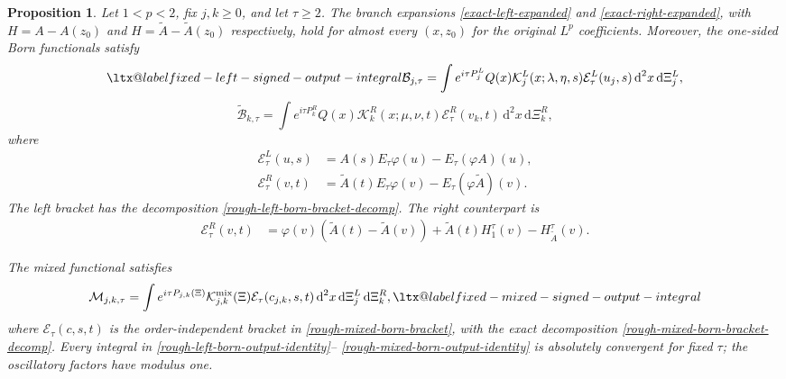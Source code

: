 \documentclass[a4paper,11pt]{article}
\makeatletter
\newcommand{\dd}{\,\text{d}}
\newcommand{\aliaslabel}[1]{\ltx@label{#1}}
\theoremstyle{plain}
\newtheorem{prop}[thm]{Proposition}
\theoremstyle{definition}
\theoremstyle{remark}
\makeatother
\begin{document}
\begin{prop}
\label{prop-direct-rough-fixed-order}
Let $1<p<2$, fix $j,k\ge0$, and let $\tau\ge2$.  The branch expansions
\eqref{exact-left-expanded} and \eqref{exact-right-expanded}, with
$H=A-A(z_0)$ and
$H=\widetilde A-\widetilde A(z_0)$ respectively, hold for almost every
$(x,z_0)$ for the original $L^p$ coefficients.  Moreover, the one-sided Born
functionals satisfy
\begin{equation}\label{rough-left-born-output-identity}\aliaslabel{fixed-left-signed-output-integral}
\mathcal B_{j,\tau}
=\int e^{i\tau P_j^L}
 Q(x)\mathcal K_j^L(x;\lambda,\eta,s)
 \mathcal E_\tau^L(u_j,s)
 \dd^2x\dd\Xi_j^L,
\end{equation}
\begin{equation}\label{rough-right-born-output-identity}
\widetilde{\mathcal B}_{k,\tau}
=\int e^{i\tau P_k^R}
 Q(x)\mathcal K_k^R(x;\mu,\nu,t)
 \mathcal E_\tau^R(v_k,t)
 \dd^2x\dd\Xi_k^R,
\end{equation}
where
\begin{align}
\mathcal E_\tau^L(u,s)
&=A(s)E_\tau\varphi(u)-E_\tau(\varphi A)(u),
\label{rough-left-born-bracket}\\
\mathcal E_\tau^R(v,t)
&=\widetilde A(t)E_\tau\varphi(v)
  -E_\tau(\varphi\widetilde A)(v).
\label{rough-right-born-bracket}
\end{align}
The left bracket has the decomposition \eqref{rough-left-born-bracket-decomp}. The right counterpart is
\begin{align}
\mathcal E_\tau^R(v,t)
&=\varphi(v)(\widetilde A(t)-\widetilde A(v))
  +\widetilde A(t)H_1^\tau(v)-H_{\widetilde A}^\tau(v).
\label{rough-right-born-bracket-decomp}
\end{align}

The mixed functional satisfies
\begin{equation}
\mathcal M_{j,k,\tau}
=\int e^{i\tau P_{j,k}(\Xi)}
 \mathcal K_{j,k}^{\rm mix}(\Xi)
 \mathcal E_\tau(c_{j,k},s,t)
 \dd^2x\dd\Xi_j^L\dd\Xi_k^R,
\label{rough-mixed-born-output-identity}\aliaslabel{fixed-mixed-signed-output-integral}
\end{equation}
where $\mathcal E_\tau(c,s,t)$ is the order-independent bracket in \eqref{rough-mixed-born-bracket}, with the exact decomposition \eqref{rough-mixed-born-bracket-decomp}.
Every integral in
\eqref{rough-left-born-output-identity}--
\eqref{rough-mixed-born-output-identity} is absolutely convergent for fixed
$\tau$; the oscillatory factors have modulus one.
\end{prop}
\end{document}
